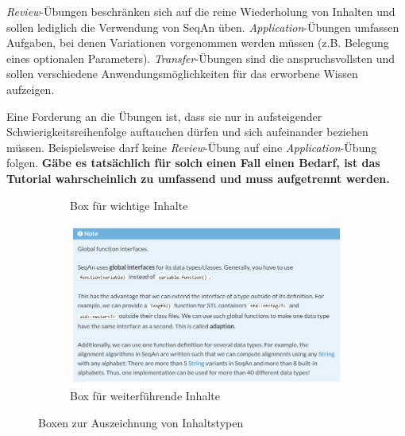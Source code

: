 \textit{Review}-Übungen beschränken sich auf die reine Wiederholung von Inhalten und sollen lediglich die Verwendung von SeqAn üben. \textit{Application}-Übungen umfassen Aufgaben, bei denen Variationen vorgenommen werden müssen (z.B. Belegung eines optionalen Parameters). \textit{Transfer}-Übungen sind die anspruchsvollsten und sollen verschiedene Anwendungsmöglichkeiten für das erworbene Wissen aufzeigen.

Eine Forderung an die Übungen ist, dass sie nur in aufsteigender Schwierigkeitsreihenfolge auftauchen dürfen und sich aufeinander beziehen müssen. Beispielsweise darf keine \textit{Review}-Übung auf eine \textit{Application}-Übung folgen. \textbf{Gäbe es tatsächlich für solch einen Fall einen Bedarf, ist das Tutorial wahrscheinlich zu umfassend und muss aufgetrennt werden.} 

\begin{figure}
        \centering
        \begin{subfigure}{0.48\linewidth}
                  \caption{Box für wichtige Inhalte}
                \label{fig:tutorial-box-important}
        \end{subfigure}%
        \hfill%
        \begin{subfigure}{0.48\linewidth}%
                \includegraphics[width=\linewidth]{Figures/tutorial-box-info.png}
                \caption{Box für weiterführende Inhalte}
                \label{fig:tutorial-box-info}
        \end{subfigure}%
        \caption{Boxen zur Auszeichnung von Inhaltstypen}%
\end{figure}

